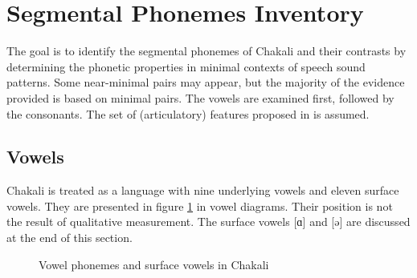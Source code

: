  


\section{Segmental Phonemes Inventory}
\label{sec:seg-phon-invent}

The goal is  to identify the segmental phonemes of Chakali and their contrasts
by determining the phonetic properties in minimal contexts of speech sound
patterns.  Some
near-minimal pairs may appear, but the   majority of the evidence provided is
based on  minimal pairs. The vowels are examined first, followed by the
consonants. The set of (articulatory) features proposed in
\cite{Lade07} is assumed.

\subsection{Vowels}
\label{sec:vowels}

Chakali is treated as a language with nine underlying vowels and eleven
surface vowels. They
are presented in figure \ref{fig:Phon-phon-srf} in  vowel diagrams. Their
position is not the result of qualitative measurement. The surface vowels  [ɑ]
and  [ə] are discussed  at the end of this section. 


\begin{figure}[!htb]
\centering

\qquad
{}

\caption{Vowel phonemes and surface vowels in Chakali \label{fig:Phon-phon-srf}}
\end{figure}




